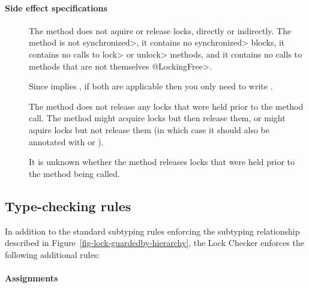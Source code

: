 \paragraph{Side effect specifications}

\begin{description}

\item[]
  The method does not aquire or release locks,
  directly or indirectly.  The method is not \<synchronized>, it contains
  no \<synchronized> blocks, it contains no calls to \<lock> or \<unlock>
  methods, and it contains no calls to methods that are not themselves \<@LockingFree>.

  Since
   implies , if both are applicable
  then you only need to write .

\item[]
  The method does not release any locks that were held prior
  to the method call.  The method might acquire locks but then release
  them, or might aquire locks but not release them (in which case it should
  also be annotated with 
   or
  ).

\item[]
  It is unknown whether the method releases
  locks that were held prior to the method being called.

\end{description}


\subsection{Type-checking rules}

In addition to the standard subtyping rules enforcing the subtyping relationship
described in Figure~\ref{fig-lock-guardedby-hierarchy}, the Lock Checker enforces
the following additional rules:


\paragraph{Assignments}

